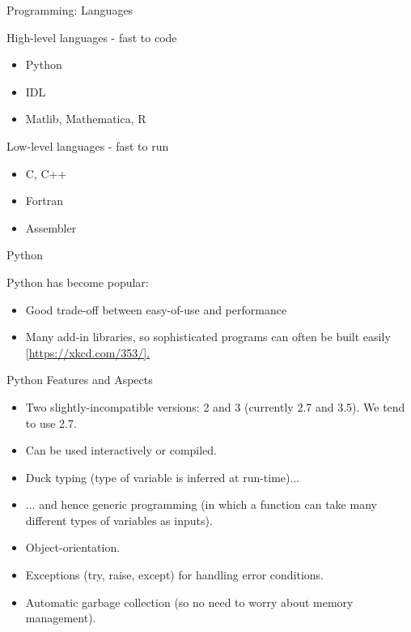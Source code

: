 \documentclass{beamer}
\begin{document}
\begin{frame}{Programming: Languages}
  \begin{block}{High-level languages - fast to code}
    \begin{itemize}
      \item Python
      \item IDL
      \item Matlib, Mathematica, R
    \end{itemize}
    \end{block}
    \begin{block}{Low-level languages - fast to run}
    \begin{itemize}
      \item C, C++
      \item Fortran
      \item Assembler
    \end{itemize}
  \end{block}
\end{frame}

\begin{frame}{Python}
  \begin{block}{Python has become popular:}
    \begin{itemize}
      \item Good trade-off between easy-of-use and performance
      \item Many add-in libraries, so sophisticated programs can often be built easily [\url{https://xkcd.com/353/].}
    \end{itemize}
  \end{block}
\end{frame}

\begin{frame}{Python Features and Aspects}
  \begin{itemize}
    \item Two slightly-incompatible versions: 2 and 3 (currently 2.7 and 3.5). We tend to use 2.7.
    \item Can be used interactively or compiled.
    \item Duck typing (type of variable is inferred at run-time)...
    \item ... and hence generic programming (in which a function can take many different types of variables as inputs).
    \item Object-orientation.
    \item Exceptions (try, raise, except) for handling error conditions.
    \item Automatic garbage collection (so no need to worry about memory management).
  \end{itemize}
\end{frame}
\end{document}
